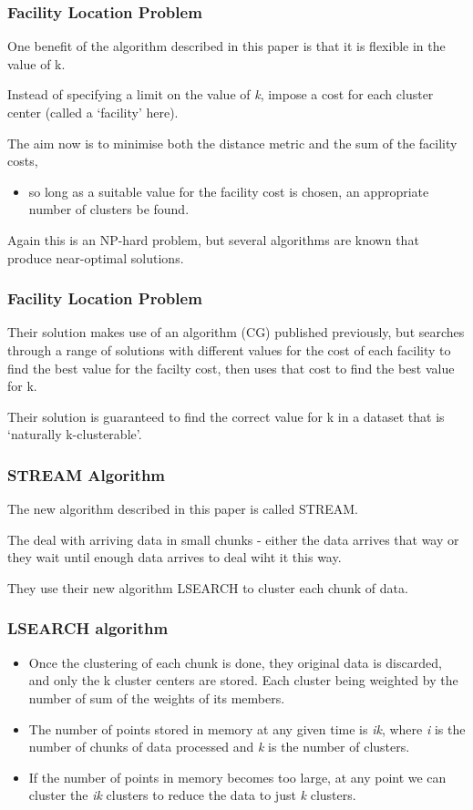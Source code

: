 \documentclass{beamer}
\begin{document}
\frame
{
  \frametitle{Facility Location Problem}

  One benefit of the algorithm described in this paper is that it is
  flexible in the value of k.
  
  Instead of specifying a limit on the value of {\em k}, impose
  a cost for each cluster center (called a `facility' here).

  \bigskip
  The aim now is to minimise both the distance metric and the
  sum of the facility costs,
  \begin{itemize}
  \item so long as a suitable value for the facility cost is
    chosen, an appropriate number of clusters be found.
  \end{itemize}
  \bigskip
  Again this is an NP-hard problem, but several algorithms are
  known that produce near-optimal solutions.

  
}
\frame
{
  \frametitle{Facility Location Problem}

  Their solution makes use of an algorithm (CG) published previously,
  but searches through a range of solutions with different values for
  the cost of each facility to find the best value for the facilty
  cost, then uses that cost to find the best value for k.

  Their solution is guaranteed to find the correct value for k in a
  dataset that is `naturally k-clusterable'.

  
}


\frame
{
  \frametitle{STREAM Algorithm}

  The new algorithm described in this paper is called STREAM.

  The deal with arriving data in small chunks - either the data
  arrives that way or they wait until enough data arrives to deal wiht
  it this way.

  They use their new algorithm LSEARCH to cluster each chunk of data.

}

\frame
{
  \frametitle{LSEARCH algorithm}

   \begin{itemize}
  \item Once the clustering of each chunk is done, they original data
    is discarded, and only the k cluster centers are stored. Each
    cluster being weighted by the number of sum of the weights of its
    members.

  \item The number of points stored in memory at any given time is
    {\em ik}, where {\em i} is the number of chunks of data processed
    and {\em k} is the number of clusters.

  \item If the number of points in memory becomes too large, at any
    point we can cluster the {\em ik} clusters to reduce the data to
    just {\em k} clusters.
  \end{itemize}

}
\end{document}
